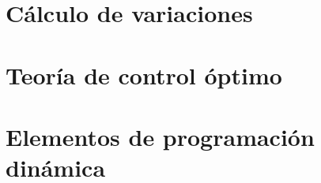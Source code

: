 \documentclass[8pt,a4paper]{extarticle}
\begin{document}
\begin{multicols}{3}
\newpage

\section{Cálculo de variaciones}

\newpage

\section{Teoría de control óptimo}

\newpage

\section{Elementos de programación dinámica}

\vfill\eject
\columnbreak
\end{multicols}
\end{document}
